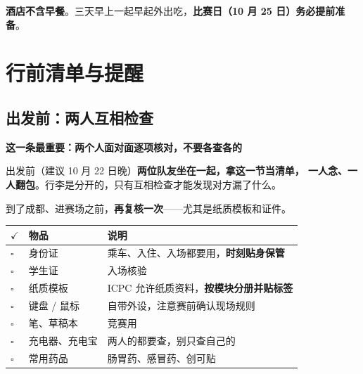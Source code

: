 \documentclass[11pt,a4paper,fontset=windows]{ctexart}
\newcommand{\thd}[1]{\textbf{\color{main}#1}}
\begin{document}
\begin{warnbox}
\textbf{酒店不含早餐}。三天早上一起早起外出吃，\textbf{比赛日（10 月 25 日）务必提前准备}。
\end{warnbox}

\newpage

\section{行前清单与提醒}\label{sec:remind}

\subsection{出发前：两人互相检查}\label{sec:mutual}

\begin{warnbox}
\textbf{\color{accent}这一条最重要：两个人面对面逐项核对，不要各查各的}

\vspace{0.4em}
出发前（建议 10 月 22 日晚）\textbf{两位队友坐在一起，拿这一节当清单，
一人念、一人翻包}。行李是分开的，只有互相检查才能发现对方漏了什么。

\vspace{0.4em}
到了成都、进赛场之前，\textbf{再复核一次}——尤其是纸质模板和证件。
\end{warnbox}

\begin{center}
\begin{tabularx}{\textwidth}{@{}L{0.9cm}L{4.0cm}X@{}}
\toprule
\thd{$\checkmark$} & \thd{物品} & \thd{说明}\\
\midrule
$\square$ & 身份证 & 乘车、入住、入场都要用，\textbf{时刻贴身保管}\\
$\square$ & 学生证 & 入场核验\\
$\square$ & 纸质模板 & ICPC 允许纸质资料，\textbf{按模块分册并贴标签}\\
$\square$ & 键盘 / 鼠标 & 自带外设，注意赛前确认现场规则\\
$\square$ & 笔、草稿本 & 竞赛用\\
$\square$ & 充电器、充电宝 & 两人的都要查，别只查自己的\\
$\square$ & 常用药品 & 肠胃药、感冒药、创可贴\\
\bottomrule
\end{tabularx}
\end{center}
\end{document}
